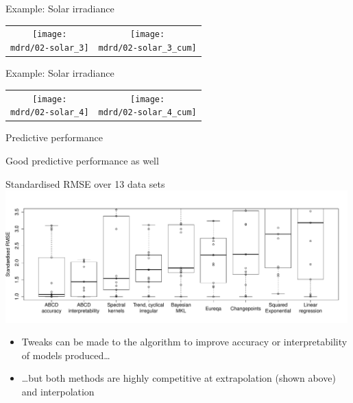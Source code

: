 \begin{frame}{Example: Solar irradiance}
\newcommand{\wmgd}{0.5\columnwidth}
\newcommand{\hmgd}{3.0cm}
\newcommand{\mdrd}{../figures/02-solar}
\newcommand{\mbm}{\hspace{-0.3cm}}
{\footnotesize

}

\vspace{\baselineskip}

\begin{tabular}{cc}
\mbm \texttt{[image: \\mdrd/02-solar\_3]} & \texttt{[image: \\mdrd/02-solar\_3\_cum]}
\end{tabular}
\end{frame}

\begin{frame}{Example: Solar irradiance}
\newcommand{\wmgd}{0.5\columnwidth}
\newcommand{\hmgd}{3.0cm}
\newcommand{\mdrd}{../figures/02-solar}
\newcommand{\mbm}{\hspace{-0.3cm}}
{\footnotesize

}

\vspace{\baselineskip}

\begin{tabular}{cc}
\mbm \texttt{[image: \\mdrd/02-solar\_4]} & \texttt{[image: \\mdrd/02-solar\_4\_cum]}
\end{tabular}
\end{frame}

\begin{frame}{Predictive performance}
  
\end{frame}

\begin{frame}{Good predictive performance as well}
  \begin{block}{Standardised RMSE over 13 data sets}
  \includegraphics[width=0.99\textwidth]{../figures/box_extrap_wide}\\
  \begin{itemize}
    \item Tweaks can be made to the algorithm to improve accuracy or interpretability of models produced\ldots
    \vspace{\baselineskip}
    \item \ldots but both methods are highly competitive at extrapolation (shown above) and interpolation
  \end{itemize}
  \end{block}
\end{frame}

